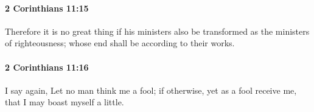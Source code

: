 		\paragraph{2 Corinthians 11:15} %
			\label{2CORINTHIANS-11-15}

			Therefore it is no great thing if his ministers also be transformed as the ministers of righteousness; whose end shall be according to their works.

			\begin{framed}
			\scriptsize
				\begin{compactdesc}
					\item[SBLG] 
				\end{compactdesc}
			\end{framed}

		\paragraph{2 Corinthians 11:16} %
			\label{2CORINTHIANS-11-16}

			I say again, Let no man think me a fool; if otherwise, yet as a fool receive me, that I may boast myself a little.

